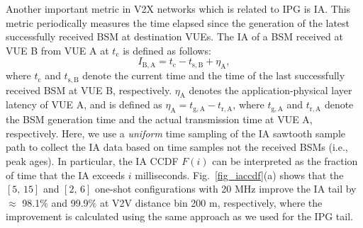 \documentclass[conference]{IEEEtran}
\begin{document}
Another important metric in V2X networks which is related to IPG is IA. This metric periodically measures the time elapsed since the generation of the latest successfully received BSM at destination VUEs. The IA of a BSM received at VUE B from VUE A at $t_{\mathrm{c}}$ is defined as follows:
\begin{equation}
    I_{\mathrm{B,A}}=t_{\mathrm{c}}-t_{\mathrm{s,B}}+\eta_{\mathrm{A}},
\end{equation}
where $t_{\mathrm{c}}$ and $t_{\mathrm{s, B}}$ denote the current time and the time of the last successfully received BSM at VUE B, respectively. $\eta_{\mathrm{A}}$ denotes the application-physical layer latency of VUE A, and is defined as $\eta_{\mathrm{A}}=t_{\mathrm{g,A}}-t_{\mathrm{r,A}}$, where $t_{\mathrm{g,A}}$ and $t_{\mathrm{r,A}}$ denote the BSM generation time and the actual transmission time at VUE A, respectively.  Here, we use a \textit{uniform} time sampling of the IA sawtooth sample path to collect the IA data based on time samples not the received BSMs (i.e., peak ages). In particular, the IA CCDF $F(i)$ can be interpreted as the fraction of time that the IA exceeds $i$ milliseconds. Fig.~\ref{fig_iaccdf}(a) shows that the $[5,\,15]$ and $[2,\,6]$ one-shot configurations with 20 MHz improve the IA tail by $\approx$ 98.1$\%$ and 99.9$\%$ at V2V distance bin 200 m, respectively, where the improvement is calculated using the same approach as we used for the IPG tail.
\begin{comment}
\begin{table}
\renewcommand{\arraystretch}{1.3}
  \centering
  \caption{Relative gains in IA statistics.}\label{tab_iastats}
        \begin{tabular}{ P{1.8cm} P{.8cm} P{.8cm} P{.8cm} P{.8cm}}
        \hline
        \textbf{V2V distance}  & \textbf{515-20} & \textbf{26-20} & \textbf{515-10} & \textbf{26-10}\\ \hline
        \multicolumn{5}{c}{\textbf{Average improvement of IA CCDF}}\\ \hline
        200 & .98139 & .99925 & .96970 & .99780\\ \hline
        300 & .95974 & .99670 & .92808 & .99139\\ \hline
        \end{tabular}
        \vspace{-.15in}
\end{table} 
\end{comment}
\end{document}
